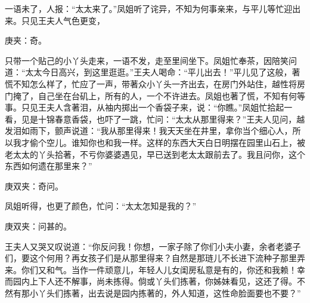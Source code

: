 \begin{parag}
    一语未了，人报：“太太来了。”凤姐听了诧异，不知为何事亲来，与平儿等忙迎出来。只见王夫人气色更变，\begin{note}庚夹：奇。\end{note}只带一个贴己的小丫头走来，一语不发，走至里间坐下。凤姐忙奉茶，因陪笑问道：“太太今日高兴，到这里逛逛。”王夫人喝命：“平儿出去！”平儿见了这般，著慌不知怎么样了，忙应了一声，带著众小丫头一齐出去，在房门外站住，越性将房门掩了，自己坐在台矶上，所有的人，一个不许进去。凤姐也著了慌，不知有何等事。只见王夫人含著泪，从袖内掷出一个香袋子来，说：“你瞧。”凤姐忙拾起一看，见是十锦春意香袋，也吓了一跳，忙问：“太太从那里得来？”王夫人见问，越发泪如雨下，颤声说道：“我从那里得来！我天天坐在井里，拿你当个细心人，所以我才偷个空儿。谁知你也和我一样。这样的东西大天白日明摆在园里山石上，被老太太的丫头拾著，不亏你婆婆遇见，早已送到老太太跟前去了。我且问你，这个东西如何遗在那里来？”\begin{note}庚双夹：奇问。\end{note}凤姐听得，也更了颜色，忙问：“太太怎知是我的？”\begin{note}庚双夹：问甚的。\end{note}王夫人又哭又叹说道：“你反问我！你想，一家子除了你们小夫小妻，余者老婆子们，要这个何用？再女孩子们是从那里得来？自然是那琏儿不长进下流种子那里弄来。你们又和气。当作一件顽意儿，年轻人儿女闺房私意是有的，你还和我赖！幸而园内上下人还不解事，尚未拣得。倘或丫头们拣著，你姊妹看见，这还了得。不然有那小丫头们拣著，出去说是园内拣著的，外人知道，这性命脸面要也不要？”
\end{parag}


